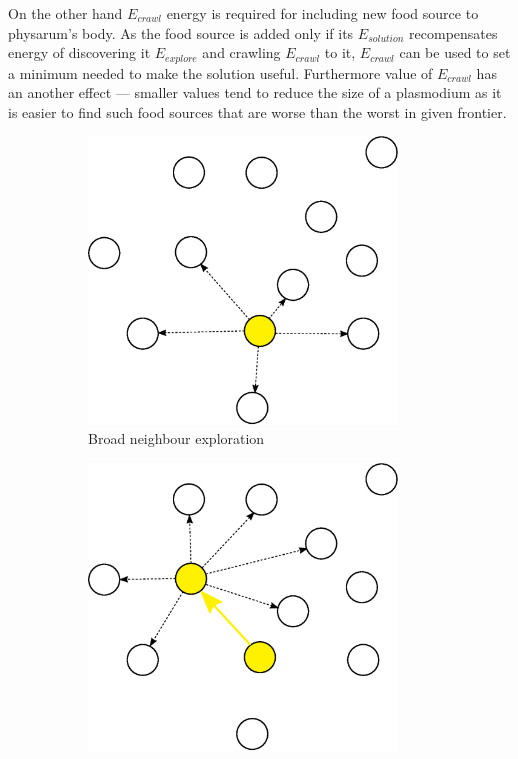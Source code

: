 \documentclass[english,a4paper,twoside]{ppfcmthesis}
\begin{document}
On the other hand $E_{crawl}$ energy is required for including new food source to physarum's body. As the food source is added only if its $E_{solution}$ recompensates energy of discovering it $E_{explore}$ and crawling $E_{crawl}$ to it, $E_{crawl}$ can be used to set a minimum needed to make the solution useful. Furthermore value of $E_{crawl}$ has an another effect --- smaller values tend to reduce the size of a plasmodium as it is easier to find such food sources that are worse than the worst in given frontier.

\begin{figure}
  \centering

  \begin{subfigure}{0.3\textwidth}
    \centering
    \includegraphics[width=0.9\textwidth]{algorithm/metaheuristic/bfs1.eps}
    \caption{Broad neighbour exploration}
  \end{subfigure}
  \begin{subfigure}{0.3\textwidth}
    \centering
    \includegraphics[width=0.9\textwidth]{algorithm/metaheuristic/bfs2.eps}

\end{subfigure}
\end{figure}
\end{document}
